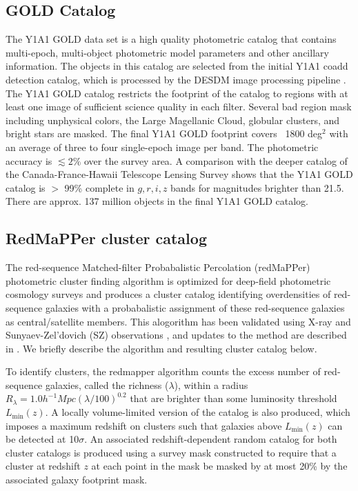 \documentclass[fleqn,usenatbib]{mnras}
\newcommand{\hinv}{h^{-1}}
\begin{document}
\subsection{GOLD Catalog}
\label{sec:y1a1gold}
The Y1A1 GOLD data set \cite{} is a high quality photometric catalog that contains multi-epoch, multi-object photometric model parameters and other ancillary information. The objects in this catalog are selected from the initial Y1A1 coadd detection catalog, which is processed by the DESDM image processing pipeline \cite{2011arXiv1109.6741S,2008SPIE.7016E..0LM}. The Y1A1 GOLD catalog restricts the footprint of the catalog to regions with at least one image of sufficient science quality in each filter. Several bad region mask including unphysical colors, the Large Magellanic Cloud, globular clusters, and bright stars are masked. The final Y1A1 GOLD footprint covers ~1800 deg$^2$ with an average of three to four single-epoch image per band. The photometric accuracy is \(\lesssim 2 \%\) over the survey area. A comparison with the deeper catalog of the Canada-France-Hawaii Telescope Lensing Survey shows that the Y1A1 GOLD catalog is $>$ 99\% complete in $g,r,i,z$ bands for magnitudes brighter than 21.5. There are approx. 137 million objects in the final Y1A1 GOLD catalog.

\subsection{RedMaPPer cluster catalog}
\label{sec:redmapper} %

The red-sequence Matched-filter Probabalistic Percolation (redMaPPer) photometric cluster finding algorithm is optimized for deep-field photometric cosmology surveys \cite{2014ApJ...785..104R} and produces a cluster catalog identifying overdensities of red-sequence galaxies with a probabalistic assignment of these red-sequence galaxies as central/satellite members. This alogorithm has been validated using X-ray and Sunyaev-Zel'dovich (SZ) observations \cite{2015MNRAS.453...38R,2015MNRAS.454.2305S,2016MNRAS.461.1431R,2014A&A...571A..87S}, and updates to the method are described in \cite{2016MNRAS.461.1431R,2016ApJS..224....1R,2019MNRAS.482.1352M}. We briefly describe the algorithm and resulting cluster catalog below.

To identify clusters, the redmapper algorithm counts the excess number of red-sequence galaxies, called the richness ($\lambda$), within a radius $R_\lambda = 1.0  \hinv  Mpc (\lambda/100)^{0.2}$ that are brighter than some luminosity threshold $L_{\mathrm{min}}(z)$. A locally volume-limited version of the catalog is also produced, which imposes a maximum redshift on clusters such that galaxies above $L_{\mathrm{min}}(z)$ can be detected at 10$\sigma$. An associated redshift-dependent random catalog for both cluster catalogs is produced using a survey mask constructed to require that a cluster at redshift $z$ at each point in the mask be masked by at most 20\% by the associated galaxy footprint mask.
\end{document}
